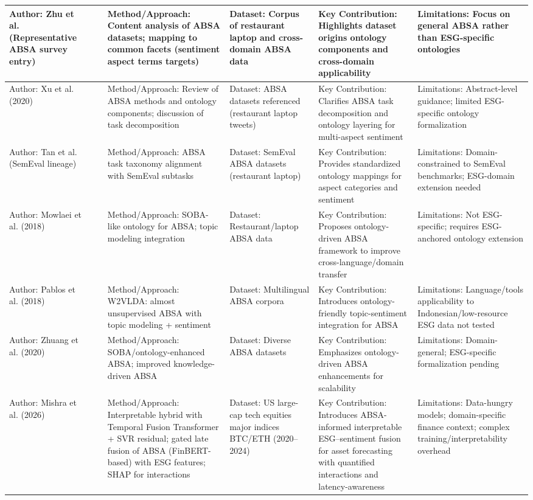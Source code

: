 \documentclass{article}
\begin{document}
\begin{landscape}
\begin{longtable}{p{1.8cm}
p{2.6cm}
p{3.4cm}
p{2.6cm}
p{3.5cm}
p{3.5cm}}
Author: Zhu et al. (Representative ABSA survey entry) & ~ & Method/Approach: Content analysis of ABSA datasets; mapping to common facets (sentiment aspect terms targets) & Dataset: Corpus of restaurant laptop and cross-domain ABSA data & Key Contribution: Highlights dataset origins ontology components and cross-domain applicability & Limitations: Focus on general ABSA rather than ESG-specific ontologies \\ \hline
Author: Xu et al. (2020) & ~ & Method/Approach: Review of ABSA methods and ontology components; discussion of task decomposition & Dataset: ABSA datasets referenced (restaurant laptop tweets) & Key Contribution: Clarifies ABSA task decomposition and ontology layering for multi-aspect sentiment & Limitations: Abstract-level guidance; limited ESG-specific ontology formalization \\ \hline
Author: Tan et al. (SemEval lineage) & ~ & Method/Approach: ABSA task taxonomy alignment with SemEval subtasks & Dataset: SemEval ABSA datasets (restaurant laptop) & Key Contribution: Provides standardized ontology mappings for aspect categories and sentiment & Limitations: Domain-constrained to SemEval benchmarks; ESG-domain extension needed \\ \hline
Author: Mowlaei et al. (2018) & ~ & Method/Approach: SOBA-like ontology for ABSA; topic modeling integration & Dataset: Restaurant/laptop ABSA data & Key Contribution: Proposes ontology-driven ABSA framework to improve cross-language/domain transfer & Limitations: Not ESG-specific; requires ESG-anchored ontology extension \\ \hline
Author: Pablos et al. (2018) & ~ & Method/Approach: W2VLDA: almost unsupervised ABSA with topic modeling + sentiment & Dataset: Multilingual ABSA corpora & Key Contribution: Introduces ontology-friendly topic-sentiment integration for ABSA & Limitations: Language/tools applicability to Indonesian/low-resource ESG data not tested \\ \hline
Author: Zhuang et al. (2020) & ~ & Method/Approach: SOBA/ontology-enhanced ABSA; improved knowledge-driven ABSA & Dataset: Diverse ABSA datasets & Key Contribution: Emphasizes ontology-driven ABSA enhancements for scalability & Limitations: Domain-general; ESG-specific formalization pending \\ \hline
Author: Mishra et al. (2026) & ~ & Method/Approach: Interpretable hybrid with Temporal Fusion Transformer + SVR residual; gated late fusion of ABSA (FinBERT-based) with ESG features; SHAP for interactions & Dataset: US large-cap tech equities major indices BTC/ETH (2020–2024) & Key Contribution: Introduces ABSA-informed interpretable ESG–sentiment fusion for asset forecasting with quantified interactions and latency-awareness & Limitations: Data-hungry models; domain-specific finance context; complex training/interpretability overhead \\ \hline

\end{longtable}
\end{landscape}
\end{document}
